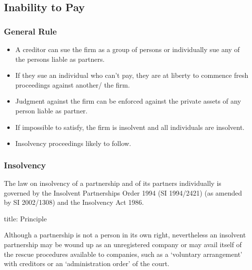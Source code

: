 \documentclass[
]{article}
\newenvironment{Shaded}{}{}
\newcommand{\NormalTok}[1]{#1}
\providecommand{\tightlist}{%
  \setlength{\itemsep}{0pt}\setlength{\parskip}{0pt}}
\begin{document}
\hypertarget{inability-to-pay}{%
\subsection{Inability to Pay}\label{inability-to-pay}}

\hypertarget{general-rule}{%
\subsubsection{General Rule}\label{general-rule}}

\begin{itemize}
\tightlist
\item
  A creditor can sue the firm as a group of persons or individually sue
  any of the persons liable as partners.
\item
  If they sue an individual who can't pay, they are at liberty to
  commence fresh proceedings against another/ the firm.
\item
  Judgment against the firm can be enforced against the private assets
  of any person liable as partner.
\item
  If impossible to satisfy, the firm is insolvent and all individuals
  are insolvent.
\item
  Insolvency proceedings likely to follow.
\end{itemize}

\hypertarget{insolvency}{%
\subsubsection{Insolvency}\label{insolvency}}

The law on insolvency of a partnership and of its partners individually
is governed by the Insolvent Partnerships Order 1994 (SI 1994/2421) (as
amended by SI 2002/1308) and the Insolvency Act 1986.

\begin{Shaded}
\begin{Highlighting}[]
\NormalTok{title: Principle}

\NormalTok{Although a partnership is not a person in its own right, nevertheless an insolvent partnership may be wound up as an unregistered company or may avail itself of the}
\NormalTok{rescue procedures available to companies, such as a ‘voluntary arrangement’ with creditors or an ‘administration order’ of the court.}
\end{Highlighting}
\end{Shaded}
\end{document}
